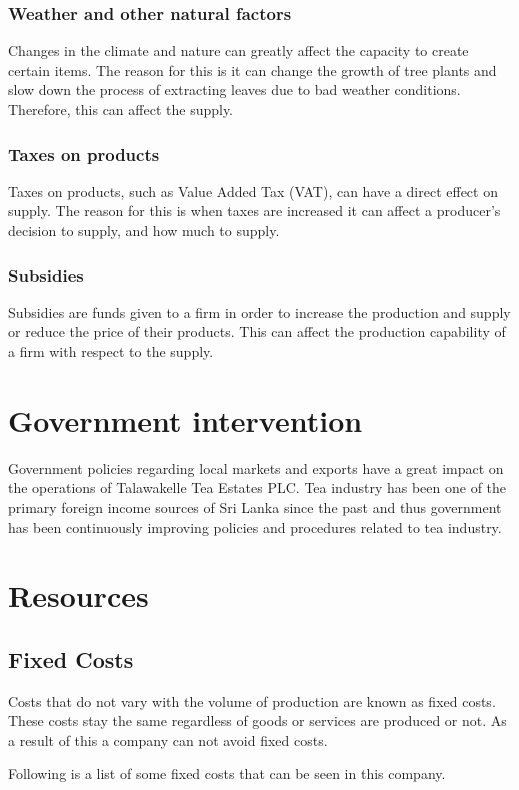 \documentclass[12pt]{report}
\begin{document}
\subsection{Weather and other natural factors}
Changes in the climate and nature can greatly affect the capacity to create certain items. The reason for this is it can change the growth of tree plants and slow down the process of extracting leaves due to bad weather conditions. Therefore, this can affect the supply.

\subsection{Taxes on products}
Taxes on products, such as Value Added Tax (VAT), can have a direct effect on supply. The reason for this is when taxes are increased it can affect a producer’s decision to supply, and how much to supply.

\subsection{Subsidies}
Subsidies are funds given to a firm in order to increase the production and supply or reduce the price of their products. This can affect the production capability of a firm with respect to the supply.

\chapter{Government intervention}
Government policies regarding local markets and exports have a great impact on the operations of Talawakelle Tea Estates PLC. Tea industry has been one of the primary foreign income sources of Sri Lanka since the past and thus government has been continuously improving policies and procedures related to tea industry.

\chapter{Resources}

\section{Fixed Costs}
Costs that do not vary with the volume of production are known as fixed costs. These costs stay the same regardless of goods or services are produced or not. As a result of this a company can not avoid fixed costs.

Following is a list of some fixed costs that can be seen in this company.
\end{document}
